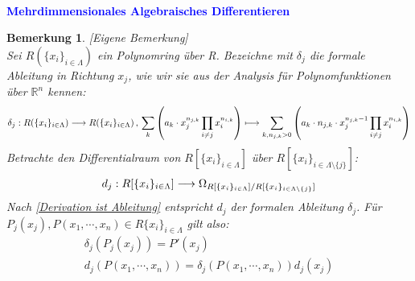\documentclass[10pt,a4paper]{report}
\newcounter{Aussage}[chapter]
\newtheorem{bem}[Aussage]{Bemerkung}
\newcommand{\functionfront}[3]{\nolinebreak{#1:#2 \longrightarrow #3}}
\newcommand{\function}[5]{\nolinebreak{#1:#2 \longrightarrow #3 \, , \, #4 \longmapsto #5}}
\newcommand{\divR}[2]{\Omega_{#1/#2}}
\newcommand{\divf}[1]{d_{#1}}
\begin{document}
\ \\
\textcolor{blue}{\textbf{Mehrdimmensionales Algebraisches Differentieren}}
\begin{bem}\label{Mehrdimmensionales Algebraisches Differentieren} \textit{[Eigene Bemerkung]}\\
Sei $R(\lbrace x_i \rbrace_{i \in \Lambda})$ ein Polynomring über R. Bezeichne mit $\delta_{j}$ die formale Ableitung in Richtung $x_j$, wie wir sie aus der Analysis für Polynomfunktionen über $\mathbb{R}^n$ kennen:
\begin{gather*}
\function{\delta_{j}}{R(\lbrace x_i \rbrace_{i \in \Lambda})}{R(\lbrace x_i \rbrace_{i \in \Lambda})}{\sum_k \left( a_k \cdot x_j^{n_{j,k}}\prod_{i \neq j} x_i^{n_{i,k}}\right)}{\sum_{k,n_{j,k} > 0} \left( a_k \cdot n_{j,k} \cdot x_j^{n_{j,k} - 1}\prod_{i \neq j} x_i^{n_{i,k}}\right)}
\end{gather*}
Betrachte den Differentialraum von $R[\lbrace x_i \rbrace_{i \in \Lambda}]$  über $R[\lbrace x_i \rbrace_{i \in \Lambda \setminus\lbrace j \rbrace}]$:
\begin{gather*}
\functionfront{\divf{j}}{R[\lbrace x_i \rbrace_{i \in \Lambda}]}{\divR{R[\lbrace x_i \rbrace_{i \in \Lambda}]}{R[\lbrace x_i \rbrace_{i \in \Lambda \setminus\lbrace j \rbrace}]}}
\end{gather*}
Nach \cref{Derivation ist Ableitung} entspricht $\divf{j}$ der formalen Ableitung $\delta_{j}$. Für $P_j(x_j),P(x_1,\cdots,x_n) \in R{\lbrace x_i \rbrace}_{i \in \Lambda}$ gilt also:
\begin{gather}
\delta_{j}(P_j(x_j)) = P'(x_j)\\
\divf{j}(P(x_1,\cdots,x_n)) = \delta_{j}(P(x_1, \cdots ,x_n))\divf{j}(x_j)
\end{gather}
\end{bem}
\end{document}
